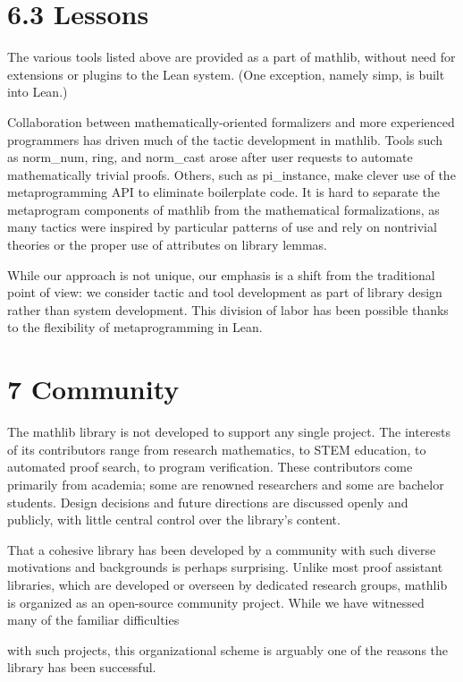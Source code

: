 \documentclass[
]{article}
\begin{document}
\section{6.3 Lessons}\label{lessons}

The various tools listed above are provided as a part of mathlib,
without need for extensions or plugins to the Lean system. (One
exception, namely simp, is built into Lean.)

Collaboration between mathematically-oriented formalizers and more
experienced programmers has driven much of the tactic development in
mathlib. Tools such as norm\_num, ring, and norm\_cast arose after user
requests to automate mathematically trivial proofs. Others, such as
pi\_instance, make clever use of the metaprogramming API to eliminate
boilerplate code. It is hard to separate the metaprogram components of
mathlib from the mathematical formalizations, as many tactics were
inspired by particular patterns of use and rely on nontrivial theories
or the proper use of attributes on library lemmas.

While our approach is not unique, our emphasis is a shift from the
traditional point of view: we consider tactic and tool development as
part of library design rather than system development. This division of
labor has been possible thanks to the flexibility of metaprogramming in
Lean.

\section{7 Community}\label{community}

The mathlib library is not developed to support any single project. The
interests of its contributors range from research mathematics, to STEM
education, to automated proof search, to program verification. These
contributors come primarily from academia; some are renowned researchers
and some are bachelor students. Design decisions and future directions
are discussed openly and publicly, with little central control over the
library's content.

That a cohesive library has been developed by a community with such
diverse motivations and backgrounds is perhaps surprising. Unlike most
proof assistant libraries, which are developed or overseen by dedicated
research groups, mathlib is organized as an open-source community
project. While we have witnessed many of the familiar difficulties

with such projects, this organizational scheme is arguably one of the
reasons the library has been successful.
\end{document}
